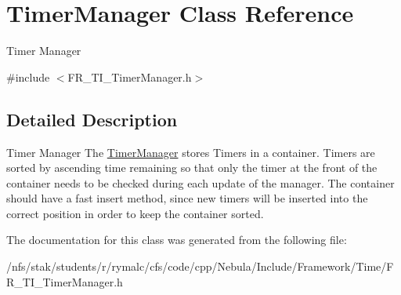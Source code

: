 \hypertarget{classTimerManager}{
\section{TimerManager Class Reference}
\label{classTimerManager}
}


Timer Manager  


{\ttfamily \#include $<$FR\_\-TI\_\-TimerManager.h$>$}

\subsection{Detailed Description}
Timer Manager The \hyperlink{classTimerManager}{TimerManager} stores Timers in a container. Timers are sorted by ascending time remaining so that only the timer at the front of the container needs to be checked during each update of the manager. The container should have a fast insert method, since new timers will be inserted into the correct position in order to keep the container sorted. 

The documentation for this class was generated from the following file:\begin{DoxyCompactItemize}
\item 
/nfs/stak/students/r/rymalc/cfs/code/cpp/Nebula/Include/Framework/Time/FR\_\-TI\_\-TimerManager.h\end{DoxyCompactItemize}
